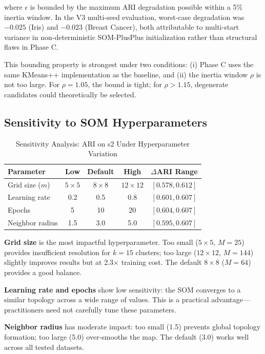\documentclass[journal]{IEEEtran}
\begin{document}
where $\epsilon$ is bounded by the maximum ARI degradation possible within a 5\% inertia window. In the V3 multi-seed evaluation, worst-case degradation was $-0.025$ (Iris) and $-0.023$ (Breast Cancer), both attributable to multi-start variance in non-deterministic SOM-PlusPlus initialization rather than structural flaws in Phase C.

This bounding property is strongest under two conditions: (i) Phase C uses the same KMeans++ implementation as the baseline, and (ii) the inertia window $\rho$ is not too large. For $\rho = 1.05$, the bound is tight; for $\rho > 1.15$, degenerate candidates could theoretically be selected.

\subsection{Sensitivity to SOM Hyperparameters}
\label{sec:sensitivity}

\begin{table}[!t]
\caption{Sensitivity Analysis: ARI on s2 Under Hyperparameter Variation}
\label{tab:sensitivity}
\centering
\renewcommand{\arraystretch}{1.1}
\small
\begin{tabular}{lcccc}
\toprule
Parameter & Low & Default & High & $\Delta$ARI Range \\
\midrule
Grid size ($m$) & $5{\times}5$ & $8{\times}8$ & $12{\times}12$ & $[0.578, 0.612]$ \\
Learning rate & 0.2 & 0.5 & 0.8 & $[0.601, 0.607]$ \\
Epochs & 5 & 10 & 20 & $[0.604, 0.607]$ \\
Neighbor radius & 1.5 & 3.0 & 5.0 & $[0.595, 0.607]$ \\
\bottomrule
\end{tabular}
\end{table}

\textbf{Grid size} is the most impactful hyperparameter. Too small ($5{\times}5$, $M=25$) provides insufficient resolution for $k=15$ clusters; too large ($12{\times}12$, $M=144$) slightly improves results but at 2.3$\times$ training cost. The default $8{\times}8$ ($M=64$) provides a good balance.

\textbf{Learning rate and epochs} show low sensitivity: the SOM converges to a similar topology across a wide range of values. This is a practical advantage---practitioners need not carefully tune these parameters.

\textbf{Neighbor radius} has moderate impact: too small (1.5) prevents global topology formation; too large (5.0) over-smooths the map. The default (3.0) works well across all tested datasets.
\end{document}
